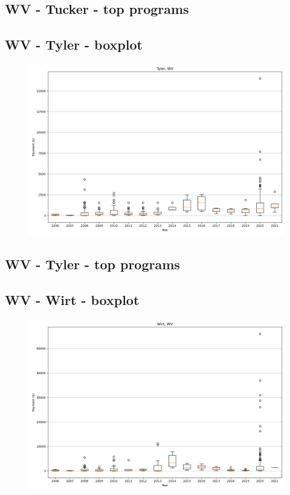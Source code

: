 \subsection*{WV - Tucker - top programs}

\newpage
\subsection*{WV - Tyler - boxplot}
\begin{figure}[h]
\centering
\includegraphics[width=7in]{../output/boxplots/counties/Tyler-WV_boxplot.png}
\end{figure}


\subsection*{WV - Tyler - top programs}

\newpage
\subsection*{WV - Wirt - boxplot}
\begin{figure}[h]
\centering
\includegraphics[width=7in]{../output/boxplots/counties/Wirt-WV_boxplot.png}
\end{figure}


